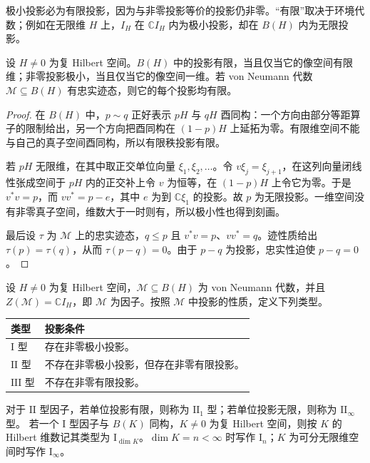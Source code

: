 极小投影必为有限投影，因为与非零投影等价的投影仍非零。“有限”取决于环境代数；例如在无限维 \(H\) 上，\(I_H\) 在 \(\mathbb C I_H\) 内为极小投影，却在 \(B(H)\) 内为无限投影。

\begin{proposition}\label{b2:prop:finite-projection-models}
	设 \(H\ne0\) 为复 Hilbert 空间。\(B(H)\) 中的投影有限，当且仅当它的像空间有限维；非零投影极小，当且仅当它的像空间一维。若 von Neumann 代数 \(\mathcal M\subseteq B(H)\) 有忠实迹态，则它的每个投影均有限。
\end{proposition}
\begin{proof}
	在 \(B(H)\) 中，\(p\sim q\) 正好表示 \(pH\) 与 \(qH\) 酉同构：一个方向由部分等距算子的限制给出，另一个方向把酉同构在 \((1-p)H\) 上延拓为零。有限维空间不能与自己的真子空间酉同构，所以有限秩投影有限。

	若 \(pH\) 无限维，在其中取正交单位向量 \(\xi_1,\xi_2,\ldots\)。令 \(v\xi_j=\xi_{j+1}\)，在这列向量闭线性张成空间于 \(pH\) 内的正交补上令 \(v\) 为恒等，在 \((1-p)H\) 上令它为零。于是 \(v^*v=p\)，而 \(vv^*=p-e\)，其中 \(e\) 为到 \(\mathbb C\xi_1\) 的投影。故 \(p\) 为无限投影。一维空间没有非零真子空间，维数大于一时则有，所以极小性也得到刻画。

	最后设 \(\tau\) 为 \(\mathcal M\) 上的忠实迹态，\(q\le p\) 且 \(v^*v=p\)、\(vv^*=q\)。迹性质给出 \(\tau(p)=\tau(q)\)，从而 \(\tau(p-q)=0\)。由于 \(p-q\) 为投影，忠实性迫使 \(p-q=0\)。
\end{proof}

\begin{definition}\label{b2:def:factor-types}
	设 \(H\ne0\) 为复 Hilbert 空间，\(\mathcal M\subseteq B(H)\) 为 von Neumann 代数，并且 \(Z(\mathcal M)=\mathbb C I_H\)，即 \(\mathcal M\) 为因子。按照 \(\mathcal M\) 中投影的性质，定义下列类型。
	\begin{center}
		\begin{tabularx}{\linewidth}{@{}lX@{}}
			\toprule
			类型 & 投影条件 \\
			\midrule
			\(\mathrm I\) 型 & 存在非零极小投影。 \\
			\(\mathrm{II}\) 型 & 不存在非零极小投影，但存在非零有限投影。 \\
			\(\mathrm{III}\) 型 & 不存在非零有限投影。 \\
			\bottomrule
		\end{tabularx}
	\end{center}
	对于 \(\mathrm{II}\) 型因子，若单位投影有限，则称为 \(\mathrm{II}_1\) 型；若单位投影无限，则称为 \(\mathrm{II}_\infty\) 型。 若一个 \(\mathrm I\) 型因子与 \(B(K)\) 同构，\(K\ne0\) 为复 Hilbert 空间，则按 \(K\) 的 Hilbert 维数记其类型为 \(\mathrm I_{\dim K}\)。\(\dim K=n<\infty\) 时写作 \(\mathrm I_n\)；\(K\) 为可分无限维空间时写作 \(\mathrm I_\infty\)。
\end{definition}

